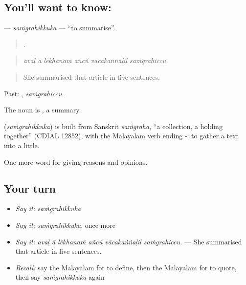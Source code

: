 \subsection*{You'll want to know: }
\textbf{} — \emph{saṁgrahikkuka} — \textquotedblleft{}to summarise\textquotedblright{}.

\begin{quote}
     .
\end{quote}

\begin{quote}
\emph{avaḷ ā lēkhanaṁ añcŭ vācakaṅṅaḷil saṁgrahiccu.}
\end{quote}

\begin{quote}
She summarised that article in five sentences.
\end{quote}

Past: , \emph{saṁgrahiccu}.

The noun is , a summary.

\begin{cousinweb}
\textbf{} (\emph{saṁgrahikkuka}) is built from Sanskrit \emph{saṁgraha}, \textquotedblleft{}a collection, a holding together\textquotedblright{} (CDIAL 12852), with the Malayalam verb ending -: to gather a text into a little.
\end{cousinweb}

\begin{grammarlens}[title={What you've built}]
One more word for giving reasons and opinions.
\end{grammarlens}

\subsection*{Your turn}
\begin{itemize}
\raggedright
  \item \emph{Say it:} \emph{saṁgrahikkuka}
  \item \emph{Say it:} \emph{saṁgrahikkuka}, once more
  \item \emph{Say it:} \emph{avaḷ ā lēkhanaṁ añcŭ vācakaṅṅaḷil saṁgrahiccu.} — She summarised that article in five sentences.
  \item \emph{Recall:} say the Malayalam for to define, then the Malayalam for to quote, then say \emph{saṁgrahikkuka} again
\end{itemize}

